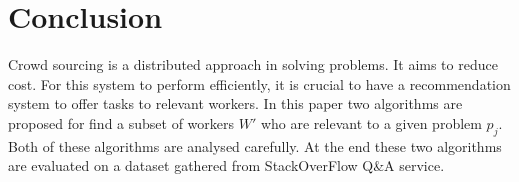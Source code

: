 \documentclass{template}
\begin{document}
\section{Conclusion}
\label{sec:conclusion}
Crowd sourcing is a distributed approach in solving problems. It aims to reduce cost.
For this system to perform efficiently, it is crucial to have a recommendation system
to offer tasks to relevant workers.
In this paper two algorithms are proposed for find a subset of workers \(W'\) who
are relevant to a given problem \(p_j\). Both of these algorithms are analysed carefully.
At the end these two algorithms are evaluated on a dataset gathered from StackOverFlow 
Q\&A service.
\end{document}
